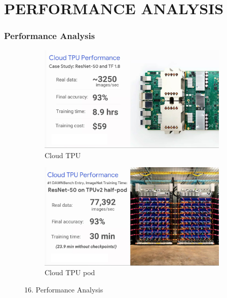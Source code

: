 \documentclass[c]{beamer}
\begin{document}
\section{PERFORMANCE ANALYSIS}
    \begin{frame}
    \frametitle{Performance Analysis}
        \begin{figure}[h]
 \hfill
\begin{subfigure}[b]{0.486\textwidth}
\includegraphics[width=\linewidth]{images/16aperformance.png}
\caption{ Cloud TPU}
\label{fig:TPUv3 pod}
\end{subfigure}
\hspace{0.1cm}
\begin{subfigure}[b]{0.486\textwidth}
\includegraphics[width=\linewidth]{images/16bperformance.png}
\caption{Cloud TPU pod}
\label{fig:TPUv3 Chip}
\end{subfigure}
\caption{16. Performance Analysis}
\label{fig:TPUv3}
\end{figure}
    \end{frame}
\end{document}

